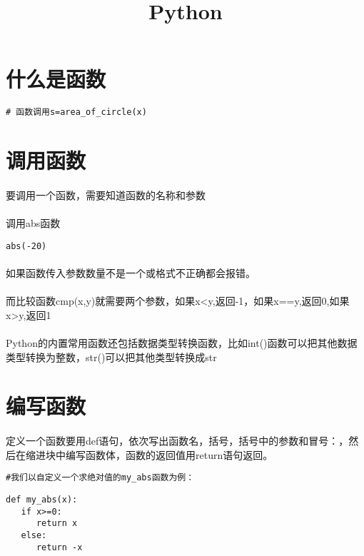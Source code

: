 \documentclass{article}
\begin{document}
\begin{CJK}{UTF8}{gbsn}\title{Python}
\date{}
\maketitle
\section{什么是函数}
\begin{verbatim}
# 函数调用s=area_of_circle(x)
\end{verbatim}
\section{调用函数}
\paragraph{}
要调用一个函数，需要知道函数的名称和参数
\paragraph{}
调用abs函数
\begin{verbatim}
abs(-20)
\end{verbatim}
\paragraph{}
如果函数传入参数数量不是一个或格式不正确都会报错。
\paragraph{}
而比较函数cmp(x,y)就需要两个参数，如果x<y,返回-1，如果x==y,返回0,如果x>y,返回1
\paragraph{}
Python的内置常用函数还包括数据类型转换函数，比如int()函数可以把其他数据类型转换为整数，str()可以把其他类型转换成str
\section{编写函数}
\paragraph{}
定义一个函数要用def语句，依次写出函数名，括号，括号中的参数和冒号：，然后在缩进块中编写函数体，函数的返回值用return语句返回。
\begin{verbatim}
#我们以自定义一个求绝对值的my_abs函数为例：
\end{verbatim}
\begin{verbatim}
def my_abs(x):
   if x>=0:
      return x
   else:
      return -x
\end{verbatim}

\end{CJK}
\end{document}
